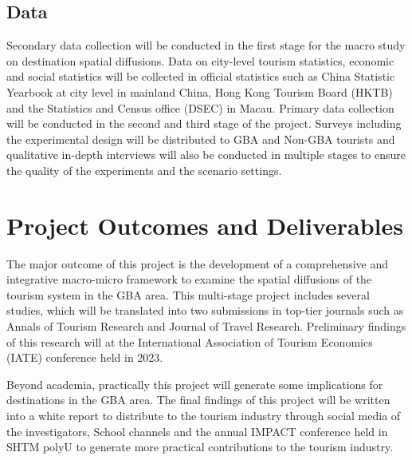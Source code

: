 \documentclass[11pt,a4paper]{amsart}
\theoremstyle{plain}
\theoremstyle{definition}
\begin{document}
\subsection{Data}\hfill\par 
\noindent Secondary data collection will be conducted in the first stage for the macro study on destination spatial diffusions. Data on city-level tourism statistics, economic and social statistics will be collected in official statistics such as China Statistic Yearbook at city level in mainland China, Hong Kong Tourism Board (HKTB) and the Statistics and Census office (DSEC) in Macau.
Primary data collection will be conducted in the second and third stage of the project. Surveys including the experimental design will be distributed to GBA and Non-GBA tourists and qualitative in-depth interviews will also be conducted in multiple stages to ensure the quality of the experiments and the scenario settings.

\section{Project Outcomes and Deliverables}\hfill\par
\noindent The major outcome of this project is the development of a comprehensive and integrative macro-micro framework to examine the spatial diffusions of the tourism system in the GBA area. This multi-stage project includes several studies, which will be translated into two submissions in top-tier journals such as Annals of Tourism Research and Journal of Travel Research. Preliminary findings of this research will at the International Association of Tourism Economics (IATE) conference held in 2023.

\noindent Beyond academia, practically this project will generate some implications for destinations in the GBA area. The final findings of this project will be written into a white report to distribute to the tourism industry through social media of the investigators, School channels and the annual IMPACT conference held in SHTM polyU to generate more practical contributions to the tourism industry.  

\vspace{20pt}
\end{document}

